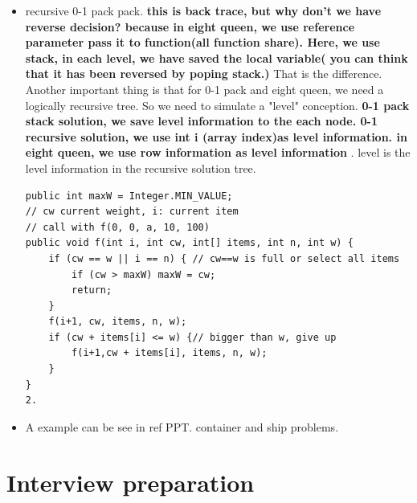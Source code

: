 \documentclass[a4paper,11pt,twoside]{book}
\begin{document}
\begin{itemize}
\item recursive 0-1 pack pack. \textbf{this is back trace, but why don't we have reverse decision? because in eight queen, we use reference parameter pass it to function(all function share). Here, we use stack, in each level, we have saved the local variable( you can think that it has been reversed by poping stack.) } That is the difference.  Another important thing is that for 0-1 pack and eight queen,  we need a logically recursive tree. So we need to simulate a "level" conception.  \textbf{0-1 pack stack solution, we save level information to the each node. 0-1 recursive solution, we use int i (array index)as level information. in eight queen, we use row information as level information }. level is the level information in the recursive solution tree.  
\begin{lstlisting}
public int maxW = Integer.MIN_VALUE; 
// cw current weight, i: current item
// call with f(0, 0, a, 10, 100)
public void f(int i, int cw, int[] items, int n, int w) {
	if (cw == w || i == n) { // cw==w is full or select all items
		if (cw > maxW) maxW = cw;
		return;
	}
	f(i+1, cw, items, n, w);
	if (cw + items[i] <= w) {// bigger than w, give up
		f(i+1,cw + items[i], items, n, w);
	}
}
2.
\end{lstlisting}


\item A example can be see in ref PPT.  container and ship problems. 

\end{itemize}


\chapter{Interview preparation}
\end{document}
